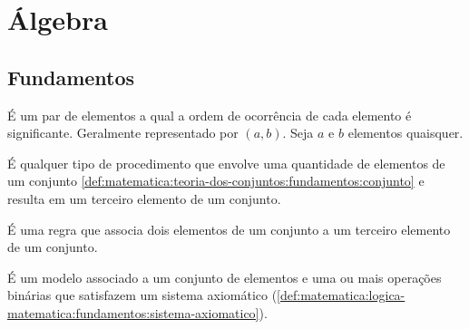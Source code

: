 \documentclass[../../main]{subfiles}
\begin{document}
\chapter{Álgebra}
\label{chap:matematica:algebra}

\section{Fundamentos}
\label{sec:matematica:algebra:fundamentos}

\begin{defn}
    \label{def:matematica:algebra:fundamentos:par-ordenado}

    É um par de elementos a qual a ordem de ocorrência de cada elemento é
    significante. Geralmente representado por $(a,b)$. Seja $a$ e $b$ elementos
    quaisquer.
\end{defn}

\begin{defn}
    \label{def:matematica:algebra:fundamentos:operacao-matematica}

    É qualquer tipo de procedimento que envolve uma quantidade de elementos de
    um conjunto \cref{def:matematica:teoria-dos-conjuntos:fundamentos:conjunto}
    e resulta em um terceiro elemento de um conjunto.
\end{defn}

\begin{defn}
    \label{def:matematica:algebra:fundamentos:operacao-binaria}

    É uma regra que associa dois elementos de um conjunto a um terceiro
    elemento de um conjunto.
\end{defn}

\begin{defn}
    \label{def:matematica:algebra:fundamentos:estrutura-algebrica}

    É um modelo associado a um conjunto de elementos e uma ou mais operações
    binárias que satisfazem um sistema axiomático
    (\cref{def:matematica:logica-matematica:fundamentos:sistema-axiomatico}).
\end{defn}
\end{document}
